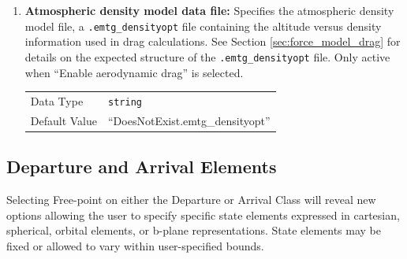 \begin{enumerate}
    \item \textbf{Atmospheric density model data file:} Specifies the atmospheric density model file, a {\tt .emtg\_densityopt} file containing the altitude versus density information used in drag calculations. See Section \ref{sec:force_model_drag} for details on the expected structure of the {\tt .emtg\_densityopt} file. Only active when ``Enable aerodynamic drag'' is selected.

            \begin{table}[H]
                \hspace{2cm}
                \begin{tabular}{ll}
                Data Type & \verb|string| \\
                Default Value & ``DoesNotExist.emtg\_densityopt'' \\
                \end{tabular}
            \end{table}
    \end{enumerate}

\subsection{Departure and Arrival Elements}
\label{sec:journey_dep_arrive_elements}
Selecting Free-point on either the Departure or Arrival Class will reveal new options allowing the user to specify specific state elements expressed in cartesian, spherical, orbital elements, or b-plane representations. State elements may be fixed or allowed to vary within user-specified bounds.


